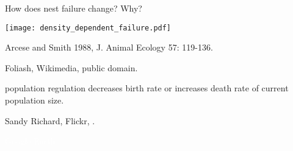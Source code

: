 \documentclass[t]{beamer}
\begin{document}
%
\begin{frame}[b]{How does nest failure change? Why?}
	\begin{center}
		\texttt{[image: density\_dependent\_failure.pdf]}
	\end{center}	

	\tiny Arcese and Smith 1988, J. Animal Ecology 57: 119-136.
\end{frame}
%
{
\begin{frame}[b]{}
\tiny\textcolor{orange5}{Foliash, Wikimedia, public domain.}
\end{frame}
}
%
{
\begin{frame}[b]{}
\end{frame}
}
%
\begin{frame}{}

	\hangpara {} population regulation decreases birth rate or increases death rate  of current population size.
		
\end{frame}
%
{
\begin{frame}[b]{}
\hfill\tiny Sandy Richard, Flickr, .
\end{frame}
}
%
{
\begin{frame}[b]

	\hfill \tiny \textcolor{white}{Google Earth}
\end{frame}
}
%
{
\begin{frame}{}
\end{frame}
}
%
\end{document}
